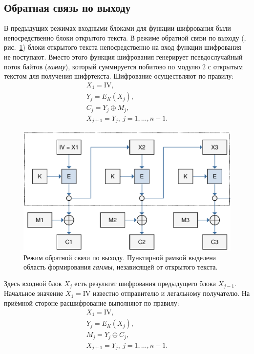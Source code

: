 \subsection{Обратная связь по выходу}

В предыдущих режимах входными блоками для функции шифрования были непосредственно блоки открытого текста. В режиме обратной связи по выходу (, рис.~\ref{fig:OFB}) блоки открытого текста непосредственно на вход функции шифрования не поступают. Вместо этого функция шифрования генерирует псевдослучайный поток байтов (\emph{гамму}), который суммируется побитово по модулю $2$ с открытым текстом для получения шифртекста. Шифрование осуществляют по правилу:
\[ \begin{array}{l}
    X_1 = \textrm{IV}, \\
    Y_j = E_K(X_j), \\
    C_j = Y_j \oplus M_j, \\
    X_{j + 1} = Y_j, ~ j = 1, \dots, n - 1.
\end{array} \]

\begin{figure}[bt]
	\centering
	\includegraphics[width=1\textwidth]{pic/OFB}
	\caption{Режим обратной связи по выходу. Пунктирной рамкой выделена область формирования \emph{гаммы}, независящей от открытого текста.}
	\label{fig:OFB}
\end{figure}

Здесь входной блок $X_j$ есть результат шифрования предыдущего блока $X_{j-1}$. Начальное значение $X_1 = \textrm{IV}$ известно отправителю и легальному получателю. На приёмной стороне расшифрование выполняют по правилу:
\[ \begin{array}{l}
    X_1 = \textrm{IV}, \\
	Y_j = E_K(X_j), \\
	M_j = Y_j \oplus C_j, \\
	X_{j + 1} = Y_j, ~ j = 1, \dots, n - 1.
\end{array} \]

